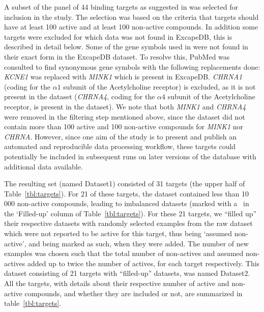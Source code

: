 \documentclass[utf8]{frontiersSCNS} %
\begin{document}
A subset of the panel of 44 binding targets as suggested in \cite{Bowes2012}
was selected for inclusion in the study. The selection was based on the
criteria that targets should have at least 100 active and at least 100
non-active compounds.  In addition some targets were excluded for which data
was not found in ExcapeDB, this is described in detail below.
%
Some of the gene symbols used in \cite{Bowes2012} were not found in their exact
form in the ExcapeDB dataset. To resolve this, PubMed was consulted to find
synonymous gene symbols with the following replacements done:
%
\textit{KCNE1} was replaced with \textit{MINK1} which is present in ExcapeDB.
\textit{CHRNA1} (coding for the $\alpha1$ subunit of the Acetylcholine
receptor) is excluded, as it is not present in the dataset (\textit{CHRNA4},
coding for the $\alpha4$ subunit of the Acetylcholine receptor, is present in
the dataset). We note that both \textit{MINK1} and \textit{CHRNA4} were removed
in the filtering step mentioned above, since the dataset did not contain more
than 100 active and 100 non-active compounds for \textit{MINK1} nor
\textit{CHRNA}.  However, since one aim of the study is to present and publish
an automated and reproducible data processing workflow, these targets could
potentially be included in subsequent runs on later versions of the database
with additional data available.

The resulting set (named Dataset1) consisted of 31 targets (the upper half of
Table~\ref{tbl:targets}).  For 21 of these targets, the dataset contained less
than 10\,000 non-active compounds, leading to imbalanced datasets (marked with
a \checkmark\ in the `Filled-up' column of Table~\ref{tbl:targets}).
%
For these 21 targets, we ``filled up'' their respective datasets with randomly
selected examples from the raw dataset which were not reported to be active for
this target, thus being `assumed non-active', and being marked as such, when
they were added. The number of new examples was chosen such that the total
number of non-actives and assumed non-actives added up to twice the number of
actives, for each target respectively. This dataset consisting of 21 targets
with ``filled-up'' datasets, was named Dataset2.
%
All the targets, with details about their respective number of active and
non-active compounds, and whether they are included or not, are summarized in
table~\ref{tbl:targets}.
\end{document}
